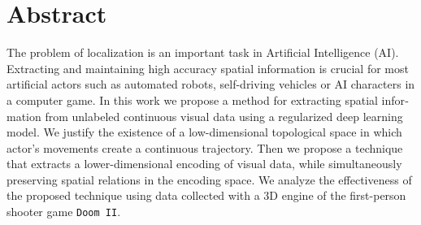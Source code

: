 
\chapter{Abstract}

\begin{english}

The problem of localization is an important task in Artificial Intelligence (AI).
Extracting and maintaining high accuracy spatial information is crucial for most artificial actors such as automated robots, self-driving vehicles or AI characters in a computer game.
In this work we propose a method for extracting spatial information from unlabeled continuous visual data using a regularized deep learning model.
We justify the existence of a low-dimensional topological space in which actor's movements create a continuous trajectory.
Then we propose a technique that extracts a lower-dimensional encoding of visual data, while simultaneously preserving spatial relations in the encoding space.
We analyze the effectiveness of the proposed technique using data collected with a 3D engine of the first-person shooter game \texttt{Doom II}.

\end{english}
